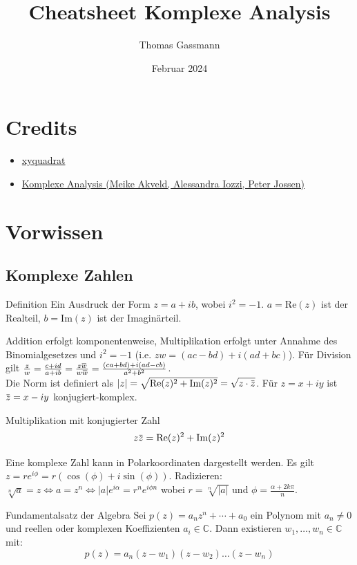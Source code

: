 \documentclass[a4paper,10pt]{article}
\title{Cheatsheet Komplexe Analysis}
\author{Thomas Gassmann}
\date{Februar 2024}
\def\C{\mathbb{C}}
\def\Re{\text{Re}}
\def\Im{\text{Im}}
\newcommand{\overbar}[1]{\mkern 1.5mu\overline{\mkern-1.5mu#1\mkern-1.5mu}\mkern 1.5mu}
\begin{document}


\section{Credits}

\begin{itemize}
    \item \href{https://github.com/XYQuadrat/eth-cheatsheets}{xyquadrat}
    \item \href{https://people.math.ethz.ch/~iozzi/SkriptKomplexeAnalysis.pdf}{Komplexe Analysis (Meike Akveld, Alessandra Iozzi, Peter Jossen)}
\end{itemize}

\section{Vorwissen}
\subsection{Komplexe Zahlen}
\begin{mainbox}{Definition}
Ein Ausdruck der Form $z = a + ib$, wobei $i^2 = -1$. $a = \Re(z)$ ist der Realteil, $b = \Im(z)$ ist der Imaginärteil.
\end{mainbox}

Addition erfolgt komponentenweise, Multiplikation erfolgt unter Annahme des Binomialgesetzes und $i^2 = -1$ (i.e. $z w = (a c - b d) + i (a d + b  c)$). Für Division gilt $\frac{z}{w} = \frac{c + id}{a + ib} = \frac{z\overbar{w}}{w\overbar{w}} = \frac{(ca + bd) + i(ad - cb)}{a^2 + b^2}$.\\
Die Norm ist definiert als $|z| = \sqrt{\Re(z)^2 + \Im(z)^2} = \sqrt{z \cdot \overbar{z}}$. Für $z = x + iy$ ist $\overbar{z} = x - iy$ konjugiert-komplex.

\begin{subbox}{Multiplikation mit konjugierter Zahl}
$$z \overbar{z} = \Re(z)^2 + \Im(z)^2$$
\end{subbox}

Eine komplexe Zahl kann in Polarkoordinaten dargestellt werden. Es gilt $z = re^{i\phi} = r(\cos(\phi) + i\sin(\phi))$.
Radizieren: $\sqrt[n]{a} = z \iff a = z^n \iff |a| e^{i\alpha} = r^n e^{i\phi n}$ wobei $r = \sqrt[n]{|a|}$ und $\phi = \frac{\alpha + 2k\pi}{n}$.

\begin{mainbox}{Fundamentalsatz der Algebra}
  Sei $p(z) = a_n z^n + \cdots + a_0$ ein Polynom mit $a_n \neq 0$ und reellen oder komplexen Koeffizienten $a_i \in \mathbb{C}$. Dann existieren $w_1, \ldots, w_n \in \C$ mit:
  $$
    p(z) = a_n (z - w_1) (z - w_2) \ldots (z - w_n)
  $$
\end{mainbox}
\end{document}

